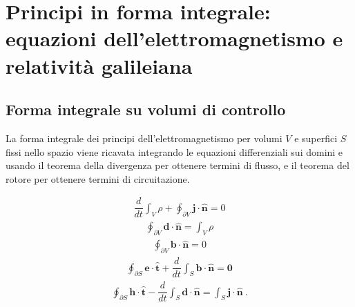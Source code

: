 \documentclass[letterpaper,10pt,italian]{jupyterBook}
\begin{document}
\section{Principi in forma integrale: equazioni dell’elettromagnetismo e relatività galileiana}
\label{\detokenize{ch/principles:principi-in-forma-integrale-equazioni-dell-elettromagnetismo-e-relativita-galileiana}}

\subsection{Forma integrale su volumi di controllo}
\label{\detokenize{ch/principles:forma-integrale-su-volumi-di-controllo}}
\sphinxAtStartPar
La forma integrale dei principi dell’elettromagnetismo per volumi \(V\) e superfici \(S\) fissi nello spazio viene ricavata integrando le equazioni differenziali sui domini e usando il teorema della divergenza per ottenere termini di flusso, e il teorema del rotore per ottenere termini di circuitazione.

\sphinxAtStartPar
{}
\begin{equation*}
\begin{split}
    \dfrac{d}{dt} \int_{V} \rho + \oint_{\partial V} \mathbf{j} \cdot \hat{\mathbf{n}} = 0
\end{split}
\end{equation*}
\sphinxAtStartPar
{}
\begin{equation*}
\begin{split}
    \oint_{\partial V} \mathbf{d} \cdot \mathbf{\hat{n}} = \int_{V} \rho
\end{split}
\end{equation*}
\sphinxAtStartPar
{}
\begin{equation*}
\begin{split}
    \oint_{\partial V} \mathbf{b} \cdot \mathbf{\hat{n}} = 0
\end{split}
\end{equation*}
\sphinxAtStartPar
{}
\begin{equation*}
\begin{split}
    \oint_{\partial S} \mathbf{e} \cdot \hat{\mathbf{t}} + \dfrac{d}{dt} \int_{S} \mathbf{b} \cdot \hat{\mathbf{n}} = \mathbf{0}
\end{split}
\end{equation*}
\sphinxAtStartPar
{}
\begin{equation*}
\begin{split}
    \oint_{\partial S} \mathbf{h} \cdot \hat{\mathbf{t}} - \dfrac{d}{dt} \int_{S} \mathbf{d} \cdot \hat{\mathbf{n}} = \int_{S} \mathbf{j} \cdot \hat{\mathbf{n}} \ .
\end{split}
\end{equation*}
\end{document}
